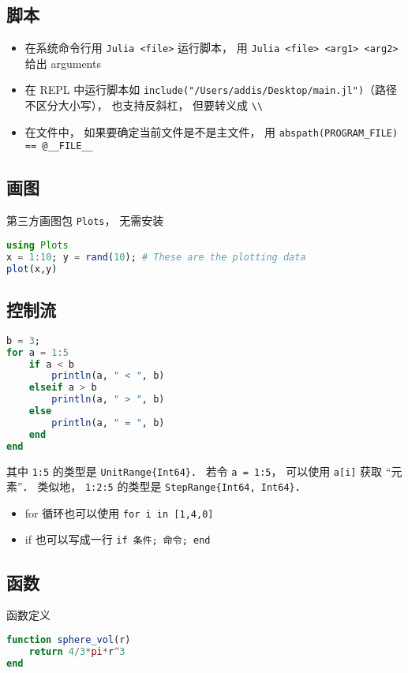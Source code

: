 \subsection{脚本}
\begin{itemize}
\item 在系统命令行用 \verb|Julia <file>| 运行脚本， 用 \verb|Julia <file> <arg1> <arg2>| 给出 arguments
\item 在 REPL 中运行脚本如 \verb|include("/Users/addis/Desktop/main.jl")|（路径不区分大小写）， 也支持反斜杠， 但要转义成 \verb|\\|
\item 在文件中， 如果要确定当前文件是不是主文件， 用 \verb|abspath(PROGRAM_FILE) == @__FILE__|
\end{itemize}

\subsection{画图}
第三方画图包 \verb|Plots|， 无需安装
\begin{lstlisting}[language=Julia]
using Plots
x = 1:10; y = rand(10); # These are the plotting data
plot(x,y)
\end{lstlisting}

\subsection{控制流}
\begin{lstlisting}[language=Julia]
b = 3;
for a = 1:5
    if a < b
        println(a, " < ", b)
    elseif a > b
        println(a, " > ", b)
    else
        println(a, " = ", b)
    end
end
\end{lstlisting}
其中 \verb|1:5| 的类型是 \verb|UnitRange{Int64}|． 若令 \verb|a = 1:5|， 可以使用 \verb|a[i]| 获取 “元素”． 类似地， \verb|1:2:5| 的类型是 \verb|StepRange{Int64, Int64}|．

\begin{itemize}
\item for 循环也可以使用 \verb|for i in [1,4,0]|
\item if 也可以写成一行 \verb|if 条件; 命令; end|
\end{itemize}

\subsection{函数}
函数定义
\begin{lstlisting}[language=julia]
function sphere_vol(r)
    return 4/3*pi*r^3
end
\end{lstlisting}

